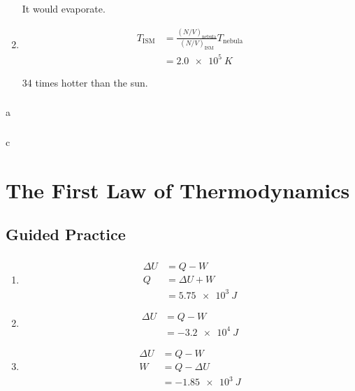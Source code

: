 \documentclass{article}
\begin{document}
\begin{enumerate}
        It would evaporate.

        \setcounter{enumi}{5}
  \item

        \begin{align*}
          T_\text{ISM} & = \frac{(N / V)_\text{nebula}}{(N / V)_\text{ISM}} T_\text{nebula} \\
                       & = \qty{2.0e5}{K}
        \end{align*}

        34 times hotter than the sun.
\end{enumerate}

\setcounter{subsubsection}{84}
\subsubsection{}

a

\setcounter{subsubsection}{86}
\subsubsection{}

c

\section{The First Law of Thermodynamics}

\subsection{Guided Practice}

\subsubsection{}

\begin{enumerate}
  \item

        \begin{align*}
          \Delta U & = Q - W           \\
          Q        & = \Delta U + W    \\
                   & = \qty{5.75e3}{J}
        \end{align*}

  \item

        \begin{align*}
          \Delta U & = Q - W           \\
                   & = \qty{-3.2e4}{J}
        \end{align*}

  \item

        \begin{align*}
          \Delta U & = Q - W            \\
          W        & = Q - \Delta U     \\
                   & = \qty{-1.85e3}{J}
        \end{align*}
\end{enumerate}
\end{document}
